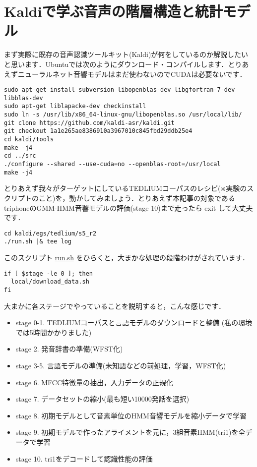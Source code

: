 \documentclass[11pt]{article}
\begin{document}
\section{Kaldiで学ぶ音声の階層構造と統計モデル}
\label{sec:org99b8367}

まず実際に既存の音声認識ツールキット(Kaldi)が何をしているのか解説したいと思います．Ubuntuでは次のようにダウンロード・コンパイルします．とりあえずニューラルネット音響モデルはまだ使わないのでCUDAは必要ないです．

\begin{verbatim}
sudo apt-get install subversion libopenblas-dev libgfortran-7-dev libblas-dev
sudo apt-get liblapacke-dev checkinstall
sudo ln -s /usr/lib/x86_64-linux-gnu/libopenblas.so /usr/local/lib/
git clone https://github.com/kaldi-asr/kaldi.git
git checkout 1a1e265ae8386910a3967010c845fbd29ddb25e4
cd kaldi/tools
make -j4
cd ../src
./configure --shared --use-cuda=no --openblas-root=/usr/local
make -j4
\end{verbatim}

とりあえず我々がターゲットにしているTEDLIUMコーパスのレシピ(※実験のスクリプトのこと)を，動かしてみましょう．とりあえず本記事の対象であるtriphoneのGMM-HMM音響モデルの評価(stage 10)まで走ったら exit して大丈夫です．

\begin{verbatim}
cd kaldi/egs/tedlium/s5_r2
./run.sh |& tee log
\end{verbatim}

このスクリプト \href{https://github.com/kaldi-asr/kaldi/blob/master/egs/tedlium/s5\_r2/run.sh}{run.sh} をひらくと，大まかな処理の段階わけがされています．
\begin{verbatim}
if [ $stage -le 0 ]; then
  local/download_data.sh
fi
\end{verbatim}
大まかに各ステージでやっていることを説明すると，こんな感じです．

\begin{itemize}
\item stage 0-1. TEDLIUMコーパスと言語モデルのダウンロードと整備 (私の環境では5時間かかりました)
\item stage 2. 発音辞書の準備(WFST化)
\item stage 3-5. 言語モデルの準備(未知語などの前処理，学習，WFST化)
\item stage 6. MFCC特徴量の抽出，入力データの正規化
\item stage 7. データセットの縮小(最も短い10000発話を選択)
\item stage 8. 初期モデルとして音素単位のHMM音響モデルを縮小データで学習
\item stage 9. 初期モデルで作ったアライメントを元に，3組音素HMM(tri1)を全データで学習
\item stage 10. tri1をデコードして認識性能の評価
\end{itemize}
\end{document}
